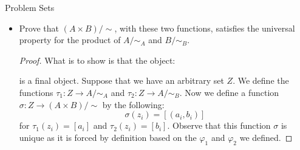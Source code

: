 \documentclass{report}
\begin{document}
\begin{exercises}{Problem Sets}
\begin{itemize}
            \item Prove that $(A \times B) / \sim $, with these two functions, satisfies the universal property for the product of $A/\sim_{A}$ and $B/\sim_{B}$.
                \begin{proof}
                    What is to show is that the object:
                        \begin{center}
                        \end{center}
                    is a final object. Suppose that we have an arbitrary set $Z$. We define the functions $\tau_{1}: Z \rightarrow A/\sim_{A}$ and $\tau_{2}: Z \rightarrow A/\sim_{B}$. Now we define a function $\sigma: Z \rightarrow (A \times B)/\sim $ by the following:
                        \begin{equation*}
                            \sigma(z_{i}) = [(a_{i}, b_{i})]
                        \end{equation*}
                    for $\tau_{1}(z_{i}) = [a_{i}]$ and $\tau_{2}(z_{i}) = [b_{i}]$. Observe that this function $\sigma$ is unique as it is forced by definition based on the $\varphi_{1}$ and $\varphi_{2}$ we defined.
                \end{proof}


\end{itemize}
\end{exercises}
\end{document}
